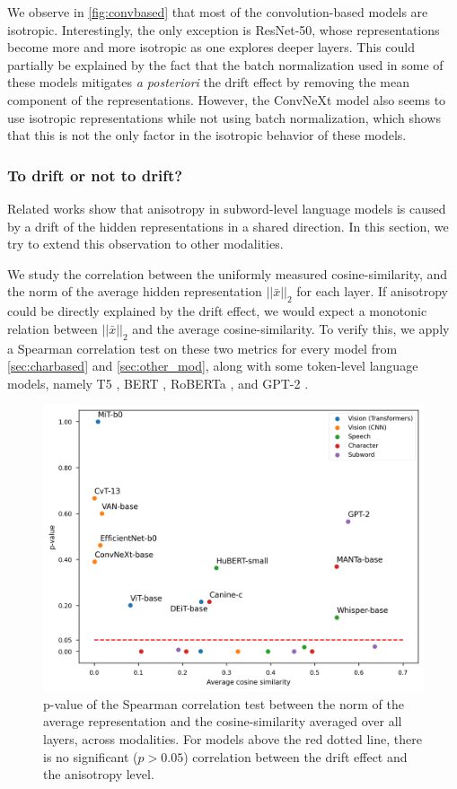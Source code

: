 We observe in \autoref{fig:convbased} that most of the convolution-based models are isotropic. Interestingly, the only exception is ResNet-50, whose representations become more and more isotropic as one explores deeper layers. This could partially be explained by the fact that the batch normalization \citep{pmlr-v37-ioffe15} used in some of these models mitigates \textit{a posteriori} the drift effect by removing the mean component of the representations. However, the ConvNeXt model also seems to use isotropic representations while not using batch normalization, which shows that this is not the only factor in the isotropic behavior of these models.

\subsubsection{To drift or not to drift?}
Related works \citep{bis-etal-2021-much, gao2018representation} show that anisotropy in subword-level language models is caused by a drift of the hidden representations in a shared direction. In this section, we try to extend this observation to other modalities.

We study the correlation between the uniformly measured cosine-similarity, and the norm of the average hidden representation $||\bar{x}||_2$ for each layer. If anisotropy could be directly explained by the drift effect, we would expect a monotonic relation between $||\bar{x}||_2$ and the average cosine-similarity. To verify this, we apply a Spearman correlation test on these two metrics for every model from \autoref{sec:charbased} and \autoref{sec:other_mod}, along with some token-level language models, namely T5 \citep{2020t5}, BERT \citep{devlin-etal-2019-bert}, RoBERTa \citep{roberta}, and GPT-2 \citep{gpt2}.

\begin{figure}[ht]
    \centering
    \includegraphics[width=0.9\linewidth]{sources/part_1/anisotropy/imgs/pval_vs_cosine_spearman.png}
    \caption{p-value of the Spearman correlation test between the norm of the average representation and the cosine-similarity averaged over all layers, across modalities. For models above the red dotted line, there is no significant ($p>0.05$) correlation between the drift effect and the anisotropy level.}
    \label{fig:pval_vs_cos}
\end{figure}


